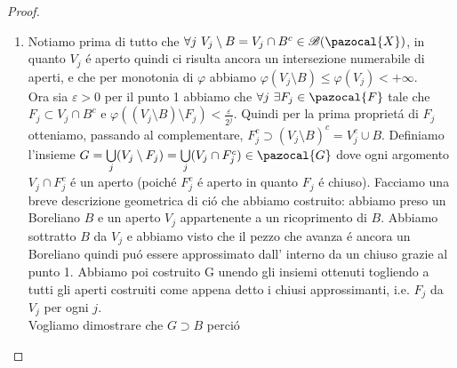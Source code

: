 \documentclass[11pt,a4paper]{report}
\theoremstyle{plain}
\theoremstyle{definition}
\newcommand{\X}{\pazocal{X}}
\newcommand{\F}{\pazocal{F}}
\newcommand{\G}{\pazocal{G}}
\newcommand{\B}{\mathcal{B}}
\begin{document}
\begin{proof}
\begin{enumerate}
\begin{enumerate}
			\[
				\varepsilon > \mu((\bigcup\limits_jE_j)\setminus A) = \lim\limits_{N\rightarrow +\infty} \mu((\bigcup\limits_jE_j) \setminus C_N)			
			\]	
			Quindi esiste $N_\varepsilon$ tale che $\mu((\bigcup\limits_jE_j)\setminus C_{N_\varepsilon}) < \varepsilon$ allora pongo $F_\varepsilon = C_{N_\varepsilon}\subset \F$ e abbiamo l'approssimazione:
				\[
					F_\varepsilon = C_{N_\varepsilon} \subset A \subset \bigcup\limits_jE_j
				\]
				e 
				\[
					\mu((\bigcup\limits_jE_j) \setminus F_\varepsilon) < \varepsilon
				\]
				Quindi $\bigcup\limits_jE_j \in D$ come volevamo.
		\end{enumerate}
		Applichiamo finalmente il Lemma 1.29 a $D$ e otteniamo che $\B(\X) \subset D$ e in particolare $B \in D$ quindi $\forall \varepsilon >0\ \exists F_\varepsilon \in \F$ tale che:
				\[
					F_\varepsilon \subset B
				\] 
				e 
				\[
					\mu(B \setminus F_\varepsilon) < \varepsilon				
				\]
				quest'ultima disequazione messa in termini di $\varphi$ diventa 
				\[
					\varphi(B \cap (B \setminus F_\varepsilon)) = \varphi(B \setminus F_\varepsilon)	.			
				\]
		\item Notiamo prima di tutto che $\forall j\ V_j \setminus B = V_j \cap B^c \in \B(\X)$, in quanto $V_j$ \'e aperto quindi ci risulta ancora un intersezione numerabile di aperti, e che per monotonia di $\varphi$ abbiamo $\varphi(V_j \setminus B) \le \varphi(V_j) < +\infty$.\\Ora sia $\varepsilon>0$ per il punto 1 abbiamo che $\forall j\ \exists F_j \in \F$ tale che $F_j \subset V_j \cap B^c$ e $\varphi((V_j \setminus B)\setminus F_j) < \frac{\varepsilon}{2^j}$. Quindi per la prima propriet\'a di $F_j$ otteniamo, passando al complementare, $F_j^c \supset (V_j \setminus B)^c = V_j^c \cup B$. Definiamo l'insieme $G=\bigcup\limits_{j}(V_j \setminus F_j) = \bigcup\limits_{j}(V_j \cap F_j^c) \in \G$ dove ogni argomento $V_j \cap F_j^c$ \'e un aperto (poich\'e $F_j^c$ \'e aperto in quanto $F_j$ \'e chiuso). Facciamo una breve descrizione geometrica di ci\'o che abbiamo costruito: abbiamo preso un Boreliano $B$ e un aperto $V_j$ appartenente a un ricoprimento di $B$. Abbiamo sottratto $B$ da $V_j$ e abbiamo visto che il pezzo che avanza \'e ancora un Boreliano quindi pu\'o essere approssimato dall' interno da un chiuso grazie al punto 1. Abbiamo poi costruito G unendo gli insiemi ottenuti togliendo a tutti gli aperti costruiti come appena detto i chiusi approssimanti, i.e.  $F_j$ da $V_j$ per ogni $j$.\\
		Vogliamo dimostrare che $G \supset B$ perci\'o 

\end{enumerate}
\end{proof}
\end{document}
